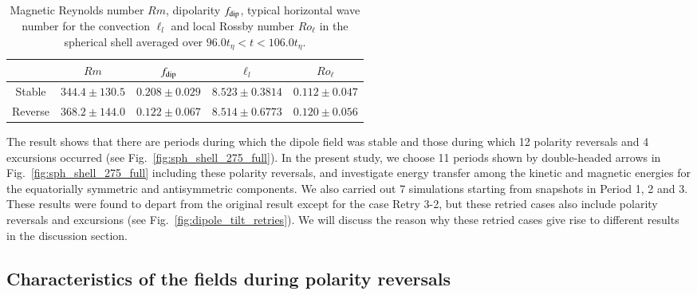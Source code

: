 \begin{table}[t]
\caption{Magnetic Reynolds number $Rm$, dipolarity $f_{\rm dip}$, 
typical horizontal wave number for the convection $\ell_{l}$
and local Rossby number $Ro_{\ell}$ in the spherical shell averaged over $96.0 t_{\eta} < t < 106.0 t_{\eta}$.
}
\label{table:average_dipolarity}
\begin{tabular}{ccccc}
 & $Rm$ & $f_{\rm dip}$ & 
  ${\ell}_{l}$ & $Ro_{\ell}$ \\ \hline
\mbox{Stable} & $344.4 \pm 130.5 $ &
                $0.208 \pm 0.029$ &
                $8.523 \pm 0.3814$ & 
                $0.112 \pm 0.047$ \\
\mbox{Reverse} & $368.2 \pm 144.0 $ &
                 $0.122 \pm 0.067$ &
                 $8.514 \pm 0.6773$ & 
                 $0.120 \pm 0.056$\\ \hline
\end{tabular}
\end{table}
%

The result shows that there are periods during which the dipole field was stable and those during which 12 polarity reversals and 4 excursions occurred (see Fig.~\ref{fig:sph_shell_275_full}).
In the present study, we choose 11 %
periods shown by double-headed arrows in Fig.~\ref{fig:sph_shell_275_full} including these polarity reversals, and investigate energy transfer among the kinetic and magnetic energies for the equatorially symmetric and antisymmetric components. 
We also carried out 7 simulations starting from snapshots in Period 1, 2 and 3. 
These results were found to depart from the original result except for the case Retry 3-2, but these retried cases also include polarity reversals and excursions (see Fig.~\ref{fig:dipole_tilt_retries}). 
We will discuss the reason why these retried cases give rise to different results in the discussion section.

\subsection{Characteristics of the fields during polarity reversals}

